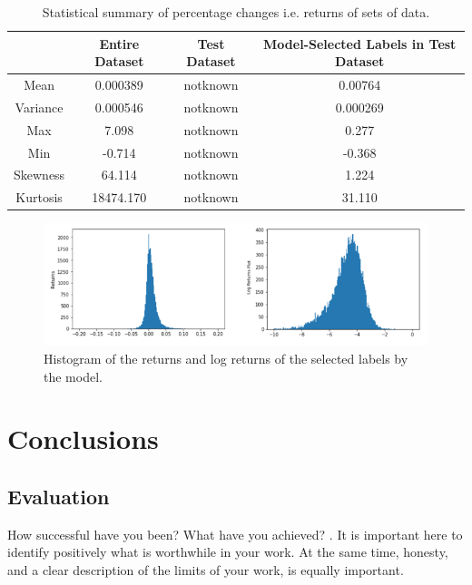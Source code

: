 \documentclass[10pt,onecolumn,letterpaper]{article}
\begin{document}
\begin{table}[hbt!]
\begin{center}
\begin{tabular}{c|c|c|c}
 & Entire Dataset & Test Dataset & Model-Selected Labels in Test Dataset\\
\hline
Mean & 0.000389 & notknown & 0.00764\\
\hline
Variance & 0.000546 & notknown & 0.000269\\
\hline
Max & 7.098 & notknown & 0.277\\
\hline
Min & -0.714 & notknown & -0.368\\
\hline
Skewness & 64.114 & notknown & 1.224\\
\hline
Kurtosis & 18474.170 & notknown & 31.110\\
\end{tabular}
\end{center}
\caption{Statistical summary of percentage changes i.e. returns of sets of data.}
\end{table}

\begin{figure}[!hbt!]
\centering
\includegraphics[width=16.5cm]{results_distributions.png}
\caption{Histogram of the returns and log returns of the selected labels by the model.}
\end{figure}


\newpage


\newpage

\section{Conclusions}

\subsection{Evaluation} \label{evaluation}
\iffalse

How successful have you been? What have you achieved? . It is important here to identify positively what is worthwhile in your work. At the same time, honesty, and a clear description of the limits of your work, is equally important.
\end{document}
